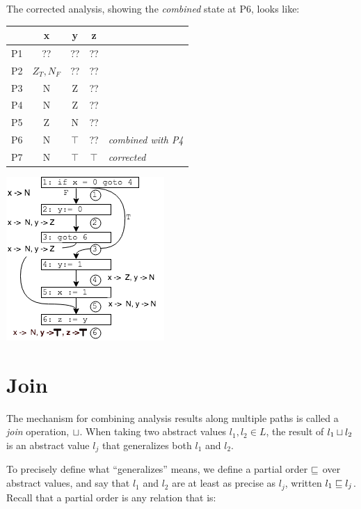\documentclass[11pt]{article}
\begin{document}
The corrected analysis, showing the \emph{combined} state at P6, looks like: 

\tablespace
\begin{center}
\begin{minipage}[t][-9.7em][b]{0.5\textwidth} %
\begin{tabular}{r | c c c l}
  & x & y & z \\
\hline
P1 & ?? & ?? & ?? \\
P2 & $Z_T,N_F$ & ??  & ?? \\
P3 & N & Z & ?? \\
P4 & N & Z & ?? \\
P5 & Z & N & ??  \\
P6 & N & $\top$ & ?? & \textit{combined with P4} \\
P7 & N & $\top$ & $\top$ & \textit{corrected}\\
\end{tabular}
\end{minipage}
\hspace*{1em}
\includegraphics[scale=0.8]{images/altpathright}
\end{center}
\tablespace

\section{Join}

The mechanism for combining analysis results along multiple paths
is called a \emph{join} operation, $\sqcup$.  When taking two abstract values $l_1, l_2
\in L$, the result of $l_1 \sqcup l_2$ is an abstract value $l_j$ that
generalizes both $l_1$ and $l_2$.

To precisely define what ``generalizes'' means, we define a partial order $\sqsubseteq$
over abstract values, and say that $l_1$ and $l_2$ are at least as precise as
$l_j$, written $l_1 \sqsubseteq l_j$.  Recall that a partial order is any relation
that is:
\end{document}

